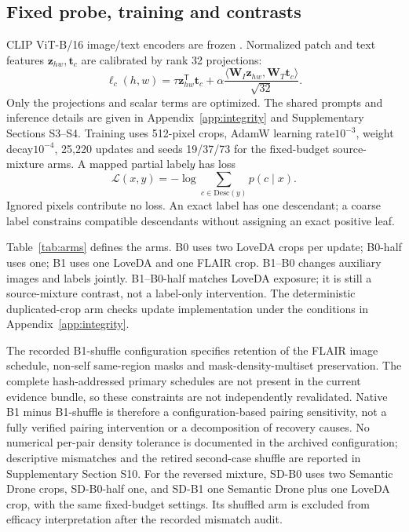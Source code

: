 \subsection{Fixed probe, training and contrasts}
\label{sec:probe}
CLIP ViT-B/16 image/text encoders are frozen \citep{radford2021clip}. Normalized patch and text features \(\mathbf z_{hw},\mathbf t_c\) are calibrated by rank 32 projections:
\begin{equation}
\ell_c(h,w)=\tau\mathbf z_{hw}^{\mathsf T}\mathbf t_c+
\alpha\frac{\langle\mathbf W_I\mathbf z_{hw},\mathbf W_T\mathbf t_c\rangle}{\sqrt{32}}.
\label{eq:adapter}
\end{equation}
Only the projections and scalar terms are optimized. The shared prompts and inference details are given in Appendix~\ref{app:integrity} and Supplementary Sections S3--S4. Training uses 512-pixel crops, AdamW learning rate\(10^{-3}\), weight decay\(10^{-4}\), 25,220 updates and seeds 19/37/73 for the fixed-budget source-mixture arms. A mapped partial label\(y\) has loss
\begin{equation}
\mathcal L(x,y)=-\log\sum_{c\in\mathrm{Desc}(y)}p(c\mid x).
\label{eq:partial_loss}
\end{equation}
Ignored pixels contribute no loss. An exact label has one descendant; a coarse label constrains compatible descendants without assigning an exact positive leaf.

Table~\ref{tab:arms} defines the arms. B0 uses two LoveDA crops per update; B0-half uses one; B1 uses one LoveDA and one FLAIR crop. B1--B0 changes auxiliary images and labels jointly. B1--B0-half matches LoveDA exposure; it is still a source-mixture contrast, not a label-only intervention. The deterministic duplicated-crop arm checks update implementation under the conditions in Appendix~\ref{app:integrity}.


The recorded B1-shuffle configuration specifies retention of the FLAIR image schedule, non-self same-region masks and mask-density-multiset preservation. The complete hash-addressed primary schedules are not present in the current evidence bundle, so these constraints are not independently revalidated. Native B1 minus B1-shuffle is therefore a configuration-based pairing sensitivity, not a fully verified pairing intervention or a decomposition of recovery causes. No numerical per-pair density tolerance is documented in the archived configuration; descriptive mismatches and the retired second-case shuffle are reported in Supplementary Section S10. For the reversed mixture, SD-B0 uses two Semantic Drone crops, SD-B0-half one, and SD-B1 one Semantic Drone plus one LoveDA crop, with the same fixed-budget settings. Its shuffled arm is excluded from efficacy interpretation after the recorded mismatch audit.


